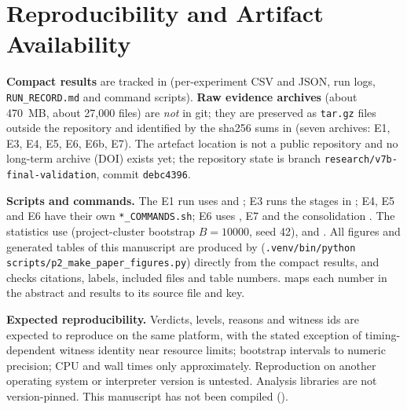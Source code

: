 \section{Reproducibility and Artifact Availability}\label{sec:repro}
\textbf{Compact results} are tracked in  (per-experiment CSV and JSON, run logs, \texttt{RUN\_RECORD.md} and command scripts). \textbf{Raw evidence archives} (about 470~MB, about 27,000 files) are \emph{not} in git; they are preserved as \texttt{tar.gz} files outside the repository and identified by the sha256 sums in  (seven archives: E1, E3, E4, E5, E6, E6b, E7). The artefact location is not a public repository and no long-term archive (DOI) exists yet; the repository state is branch \texttt{research/v7b-final-validation}, commit \texttt{debc4396}.

\textbf{Scripts and commands.} The E1 run uses  and ; E3 runs the stages in ; E4, E5 and E6 have their own \texttt{*\_COMMANDS.sh}; E6 uses , E7  and the consolidation . The statistics use  (project-cluster bootstrap $B=10000$, seed 42),  and . All figures and generated tables of this manuscript are produced by  (\texttt{.venv/bin/python scripts/p2\_make\_paper\_figures.py}) directly from the compact results, and  checks citations, labels, included files and table numbers.  maps each number in the abstract and results to its source file and key.

\textbf{Expected reproducibility.} Verdicts, levels, reasons and witness ids are expected to reproduce on the same platform, with the stated exception of timing-dependent witness identity near resource limits; bootstrap intervals to numeric precision; CPU and wall times only approximately. Reproduction on another operating system or interpreter version is untested. Analysis libraries are not version-pinned. This manuscript has not been compiled ().
